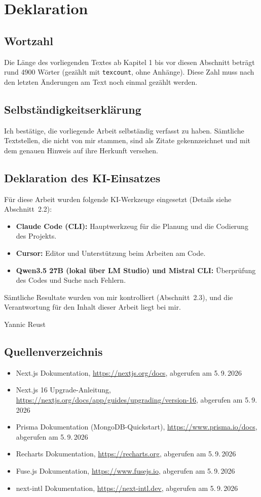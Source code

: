 \documentclass[11pt,a4paper]{article}
\let\oldsubsection\subsection
\renewcommand{\subsection}{\needspace{6\baselineskip}\oldsubsection}
\begin{document}
\section{Deklaration}

\subsection{Wortzahl}
Die Länge des vorliegenden Textes ab Kapitel 1 bis vor diesen Abschnitt beträgt rund 4900 Wörter (gezählt mit \texttt{texcount}, ohne Anhänge). Diese Zahl muss nach den letzten Änderungen am Text noch einmal gezählt werden.

\subsection{Selbständigkeitserklärung}
Ich bestätige, die vorliegende Arbeit selbständig verfasst zu haben. Sämtliche Textstellen, die nicht von mir stammen, sind als Zitate gekennzeichnet und mit dem genauen Hinweis auf ihre Herkunft versehen.

\subsection{Deklaration des KI-Einsatzes}
Für diese Arbeit wurden folgende KI-Werkzeuge eingesetzt (Details siehe Abschnitt~2.2):
\begin{itemize}[nosep]
  \item \textbf{Claude Code (CLI):} Hauptwerkzeug für die Planung und die Codierung des Projekts.
  \item \textbf{Cursor:} Editor und Unterstützung beim Arbeiten am Code.
  \item \textbf{Qwen3.5 27B (lokal über LM Studio) und Mistral CLI:} Überprüfung des Codes und Suche nach Fehlern.
\end{itemize}
Sämtliche Resultate wurden von mir kontrolliert (Abschnitt~2.3), und die Verantwortung für den Inhalt dieser Arbeit liegt bei mir.

\vspace{1.5cm}
Yannic Reust

\subsection{Quellenverzeichnis}
\begin{itemize}[leftmargin=*]
  \item Next.js Dokumentation, \url{https://nextjs.org/docs}, abgerufen am 5.\,9.\,2026
  \item Next.js 16 Upgrade-Anleitung, \url{https://nextjs.org/docs/app/guides/upgrading/version-16}, abgerufen am 5.\,9.\,2026
  \item Prisma Dokumentation (MongoDB-Quickstart), \url{https://www.prisma.io/docs}, abgerufen am 5.\,9.\,2026
  \item Recharts Dokumentation, \url{https://recharts.org}, abgerufen am 5.\,9.\,2026
  \item Fuse.js Dokumentation, \url{https://www.fusejs.io}, abgerufen am 5.\,9.\,2026
  \item next-intl Dokumentation, \url{https://next-intl.dev}, abgerufen am 5.\,9.\,2026
\end{itemize}
\end{document}

